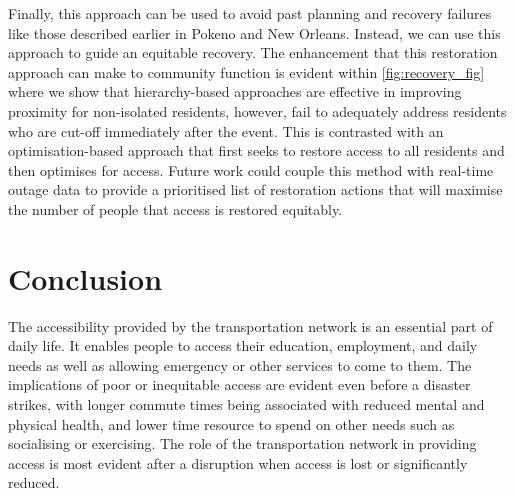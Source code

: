 \documentclass[review,3p,times,onecolumn,sort&compress,12pt]{elsarticle}
\begin{document}
Finally, this approach can be used to avoid past planning and recovery failures like those described earlier in Pokeno and New Orleans.
Instead, we can use this approach to guide an equitable recovery.
The enhancement that this restoration approach can make to community function is evident within \autoref{fig:recovery_fig} where we show that hierarchy-based approaches are effective in improving proximity for non-isolated residents, however, fail to adequately address residents who are cut-off immediately after the event.
This is contrasted with an optimisation-based approach that first seeks to restore access to all residents and then optimises for access. 
Future work could couple this method with real-time outage data to provide a prioritised list of restoration actions that will maximise the number of people that access is restored equitably.





\section{Conclusion}
The accessibility provided by the transportation network is an essential part of daily life.
It enables people to access their education, employment, and daily needs as well as allowing emergency or other services to come to them. 
The implications of poor or inequitable access are evident even before a disaster strikes, with longer commute times being associated with reduced mental and physical health, and lower time resource to spend on other needs such as socialising or exercising.
The role of the transportation network in providing access is most evident after a disruption when access is lost or significantly reduced.
\end{document}
